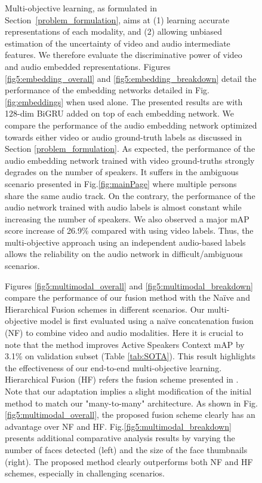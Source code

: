 \documentclass[a4paper]{article}
\begin{document}
\begin{figure}[t]
Multi-objective learning, as formulated in Section~\ref{problem_formulation}, aims at (1) learning accurate representations of each modality, and (2) allowing unbiased estimation of the uncertainty of video and audio intermediate features. We therefore evaluate the discriminative power of video and audio embedded representations. Figures \ref{fig5:embedding_overall} and \ref{fig5:embedding_breakdown} detail the performance of the embedding networks detailed in Fig.\ref{fig:embeddings} when used alone. The presented results are with 128-dim BiGRU added on top of each embedding network.
We compare the performance of the audio embedding network optimized towards either video or audio ground-truth labels as discussed in Section \ref{problem_formulation}.
As expected, the performance of the audio embedding network trained with video ground-truths strongly degrades on the number of speakers. It suffers in the ambiguous scenario presented in Fig.\ref{fig:mainPage} where multiple persons share the same audio track.
On the contrary, the performance of the audio network trained with audio labels is almost constant while increasing the number of speakers. We also observed a major mAP score increase of 26.9\% compared with using video labels. Thus,
the multi-objective approach using an independent audio-based labels allows the reliability on the audio network in difficult/ambiguous scenarios.


Figures \ref{fig5:multimodal_overall} and \ref{fig5:multimodal_breakdown} compare the performance
of our fusion method with the Naïve and Hierarchical \cite{melissa} Fusion schemes in different scenarios. Our multi-objective model is first evaluated using a naïve concatenation fusion (NF) to combine video and audio modalities. Here it is crucial to note that the method improves Active Speakers Context \cite{Alcazar_2020_CVPR} mAP by 3.1\% on validation subset (Table \ref{tab:SOTA}). This result highlights the effectiveness of our end-to-end multi-objective learning. Hierarchical Fusion (HF) refers the fusion scheme presented in \cite{melissa}. Note that our adaptation implies a slight modification of the initial method to match our "many-to-many" architecture.
As shown in Fig.\ref{fig5:multimodal_overall}, the proposed fusion scheme clearly has an advantage over NF and HF.
Fig.\ref{fig5:multimodal_breakdown} presents additional comparative analysis results by varying the number of faces detected (left) and the size of the face thumbnails (right). The proposed method clearly outperforms both NF and HF schemes, especially in challenging scenarios.
































\end{figure}
\end{document}

